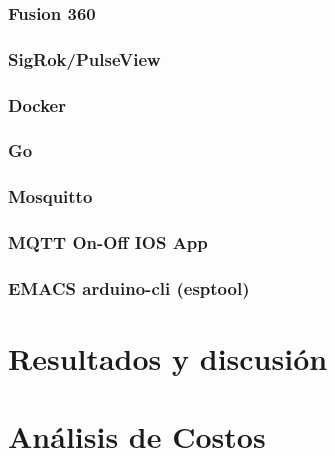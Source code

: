 \documentclass[11pt]{article}
\begin{document}
\subsubsection{Fusion 360}
\label{sec:org3741d73}
\subsubsection{SigRok/PulseView}
\label{sec:org4f71942}
\subsubsection{Docker}
\label{sec:org1f97ce8}
\subsubsection{Go}
\label{sec:orgad1657b}
\subsubsection{Mosquitto}
\label{sec:org8d6ad29}
\subsubsection{MQTT On-Off IOS App}
\label{sec:org90373d3}
\subsubsection{EMACS arduino-cli (esptool)}
\label{sec:org3b77dcc}
\section{Resultados y discusión}
\label{sec:org3f77a4d}

\section{Análisis de Costos}
\label{sec:orgb34de3a}
\end{document}
